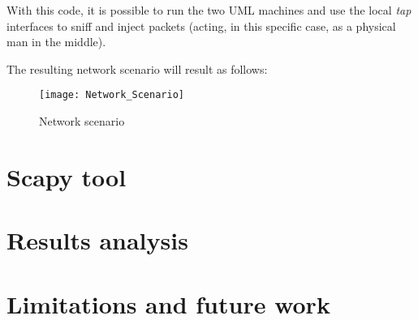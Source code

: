 With this code, it is possible to run the two UML machines and use the local \textit{tap} interfaces to sniff and inject packets (acting, in this specific case, as a physical man in the middle).

The resulting network scenario will result as follows:

\begin{figure}[htp]
\centering
\texttt{[image: Network\_Scenario]}
\caption{Network scenario}
\label{fig:networkscenario}
\end{figure}
















\section{Scapy tool}
\section{Results analysis}
\section{Limitations and future work}

